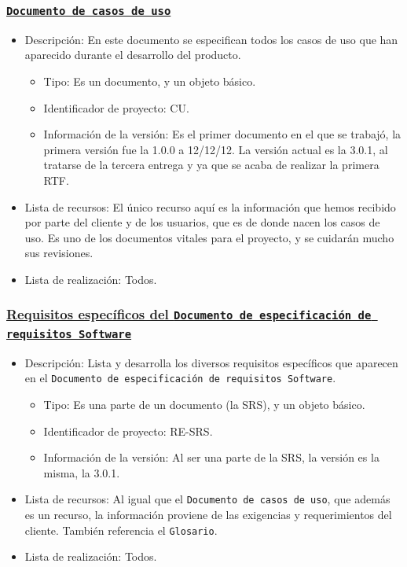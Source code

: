 \documentclass[spanish,a4paper,11pt, twoside]{report}	%
\begin{document}
			\subsubsection{\texttt{\underline{Documento de casos de uso}}}
			\begin{itemize}	
				\item{Descripción:} En este documento se especifican todos los casos de uso que han aparecido durante el desarrollo del producto.
					\begin{itemize}	
						\item{Tipo:} Es un documento, y un objeto básico. 
						\item{Identificador de proyecto:} CU.
						\item{Información de la versión:} Es el primer documento en el que se trabajó, la primera versión fue la 1.0.0 a 12/12/12. La versión actual es la 3.0.1, al tratarse de la tercera entrega y ya que se acaba de realizar la primera RTF.
					\end{itemize}	
				\item{Lista de recursos:} El único recurso aquí es la información que hemos recibido por parte del cliente y de los usuarios, que es de donde nacen los casos de uso. Es uno de los documentos vitales para el proyecto, y se cuidarán mucho sus revisiones.
				\item{Lista de realización:} Todos.
			\end{itemize}		

			\subsubsection{\underline{Requisitos específicos del \texttt{Documento de especificación de requisitos Software}}}
			\begin{itemize}	
				\item{Descripción:} Lista y desarrolla los diversos requisitos específicos que aparecen en el \texttt{Documento de especificación de requisitos Software}.
					\begin{itemize}	
						\item{Tipo:} Es una parte de un documento (la SRS), y un objeto básico. 
						\item{Identificador de proyecto:} RE-SRS.
						\item{Información de la versión:} Al ser una parte de la SRS, la versión es la misma, la 3.0.1.
					\end{itemize}	
				\item{Lista de recursos:} Al igual que el \texttt{Documento de casos de uso}, que además  es un recurso, la información proviene de las exigencias y requerimientos del cliente. También referencia el \texttt{Glosario}.
				\item{Lista de realización:} Todos.
			\end{itemize}		
\end{document}
